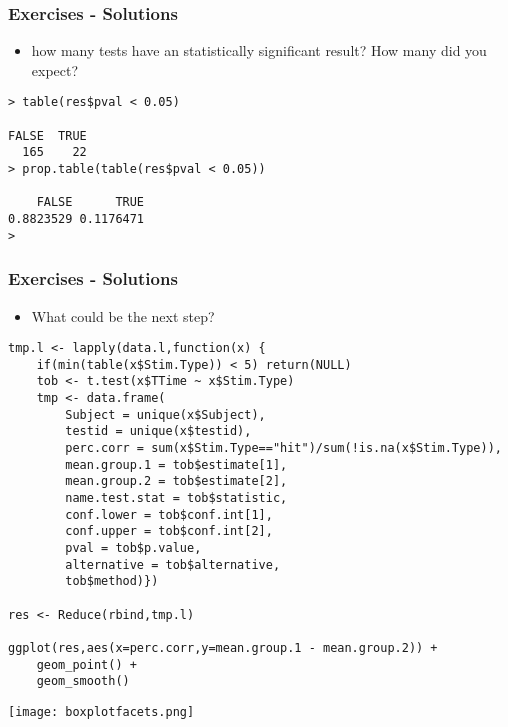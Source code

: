 \begin{frame}[fragile]\frametitle{Exercises - Solutions}
  \begin{itemize}
  \item how many tests have an statistically significant result? How many did you expect? 
  \end{itemize}\footnotesize
\begin{verbatim}
> table(res$pval < 0.05)

FALSE  TRUE 
  165    22 
> prop.table(table(res$pval < 0.05))

    FALSE      TRUE 
0.8823529 0.1176471 
> 
\end{verbatim}
\end{frame}


\begin{frame}\frametitle{Exercises - Solutions}
  \begin{itemize}
  \item  What could be the next step?
  \end{itemize}\tiny
\begin{verbatim}
tmp.l <- lapply(data.l,function(x) {
    if(min(table(x$Stim.Type)) < 5) return(NULL)
    tob <- t.test(x$TTime ~ x$Stim.Type)
    tmp <- data.frame(
        Subject = unique(x$Subject),
        testid = unique(x$testid),
        perc.corr = sum(x$Stim.Type=="hit")/sum(!is.na(x$Stim.Type)),
        mean.group.1 = tob$estimate[1],
        mean.group.2 = tob$estimate[2],
        name.test.stat = tob$statistic,
        conf.lower = tob$conf.int[1],
        conf.upper = tob$conf.int[2],
        pval = tob$p.value,
        alternative = tob$alternative,
        tob$method)})

res <- Reduce(rbind,tmp.l)

ggplot(res,aes(x=perc.corr,y=mean.group.1 - mean.group.2)) +
    geom_point() +
    geom_smooth()
\end{verbatim}
\begin{center}
  \texttt{[image: boxplotfacets.png]}
\end{center}
\end{frame}


